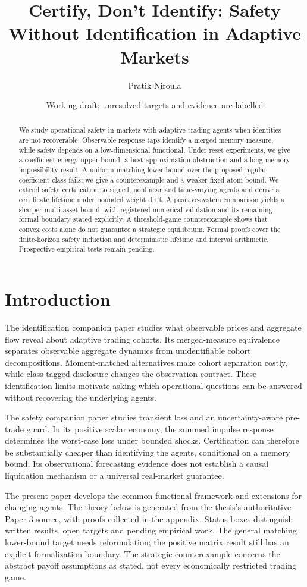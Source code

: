 \title{Certify, Don't Identify: Safety Without Identification in Adaptive Markets}
\author{Pratik Niroula}
\date{Working draft; unresolved targets and evidence are labelled}
\maketitle
\begin{abstract}
We study operational safety in markets with adaptive trading agents when identities are not recoverable. Observable response taps identify a merged memory measure, while safety depends on a low-dimensional functional. Under reset experiments, we give a coefficient-energy upper bound, a best-approximation obstruction and a long-memory impossibility result. A uniform matching lower bound over the proposed regular coefficient class fails; we give a counterexample and a weaker fixed-atom bound. We extend safety certification to signed, nonlinear and time-varying agents and derive a certificate lifetime under bounded weight drift. A positive-system comparison yields a sharper multi-asset bound, with registered numerical validation and its remaining formal boundary stated explicitly. A threshold-game counterexample shows that convex costs alone do not guarantee a strategic equilibrium. Formal proofs cover the finite-horizon safety induction and deterministic lifetime and interval arithmetic. Prospective empirical tests remain pending.
\end{abstract}
\section{Introduction}
The identification companion paper \citep{p3:paper1} studies what observable prices and aggregate flow reveal about adaptive trading cohorts. Its merged-measure equivalence separates observable aggregate dynamics from unidentifiable cohort decompositions. Moment-matched alternatives make cohort separation costly, while class-tagged disclosure changes the observation contract. These identification limits motivate asking which operational questions can be answered without recovering the underlying agents.

The safety companion paper \citep{p3:paper2} studies transient loss and an uncertainty-aware pre-trade guard. In its positive scalar economy, the summed impulse response determines the worst-case loss under bounded shocks. Certification can therefore be substantially cheaper than identifying the agents, conditional on a memory bound. Its observational forecasting evidence does not establish a causal liquidation mechanism or a universal real-market guarantee.

The present paper develops the common functional framework and extensions for changing agents. The theory below is generated from the thesis's authoritative Paper 3 source, with proofs collected in the appendix. Status boxes distinguish written results, open targets and pending empirical work. The general matching lower-bound target needs reformulation; the positive matrix result still has an explicit formalization boundary. The strategic counterexample concerns the abstract payoff assumptions as stated, not every economically restricted trading game.
